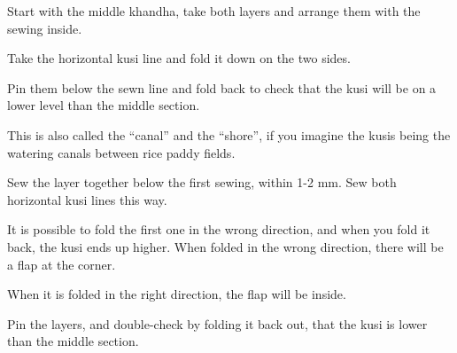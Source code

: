 Start with the middle khandha, take both layers and arrange them with
the sewing inside.

Take the horizontal kusi line and fold it down on the two sides.

\setlength{\nextPhotoWidth}{0.5\textwidth}


Pin them below the sewn line and fold back to check that the kusi will
be on a lower level than the middle section.


\setlength{\nextPhotoWidth}{0.5\textwidth}


This is also called the ``canal'' and the ``shore'', if you imagine the
kusis being the watering canals between rice paddy fields.

Sew the layer together below the first sewing, within 1-2 mm. Sew both
horizontal kusi lines this way.

\begin{multicols}{2}

\setlength{\nextPhotoWidth}{0.8\linewidth}


\columnbreak

\setlength{\nextPhotoWidth}{\linewidth}


\end{multicols}

\clearpage

It is possible to fold the first one in the wrong direction, and when
you fold it back, the kusi ends up higher. When folded in the wrong
direction, there will be a flap at the corner.

When it is folded in the right direction, the flap will be inside.

\setlength{\nextPhotoWidth}{0.5\textwidth}



Pin the layers, and double-check by folding it back out, that the kusi
is lower than the middle section.

